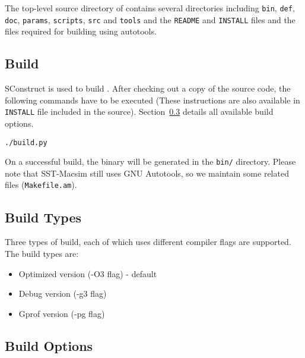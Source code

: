 \ignore
	  {
		The top-level source directory of \SIM contains several directories including
		\Verb+bin+, \Verb+def+, \Verb+doc+, \Verb+params+, \Verb+scripts+, \Verb+src+ and
		\Verb+tools+ and the \Verb+README+ and \Verb+INSTALL+ files and the files
		required for building \SIM using autotools.
	  }


\subsection{Build}

SConstruct is used to build \SIM. After checking out a copy of the
\SIM source code, the following commands have to be executed (These
instructions are also available in \Verb+INSTALL+ file included in the
\SIM source). Section~\ref{sec:buildoption} details all available build options.


\begin{Verbatim}
./build.py
\end{Verbatim}

\noindent
On a successful build, the binary \bin will be generated in the
\Verb+bin/+ directory. Please note that SST-Macsim still uses
GNU Autotools, so we maintain some related files (\Verb+Makefile.am+).


\subsection{Build Types}

Three types of build, each of which uses different compiler flags are
supported. The build types are:

\begin{itemize}
  \item Optimized version (-O3 flag) - default
  \item Debug version (-g3 flag)
  \item Gprof version (-pg flag)
\end{itemize}


\subsection{Build Options}
\label{sec:buildoption}

